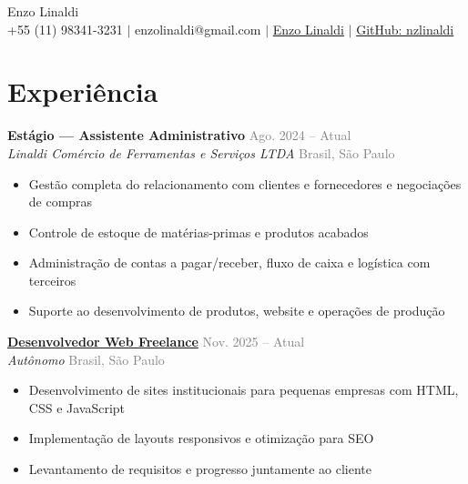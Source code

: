 \documentclass[a4paper, 12pt]{article}
\newcommand{\resumeSubSection}[4]{%
\vspace{-1pt}\noindent
\textbf{#1} \hfill \textcolor{gray}{#2}\\
\textit{#3} \hfill \textcolor{gray}{#4}
}
\newcommand{\resumeItemsSubSection}[1]{%
\vspace{-8pt}\small \begin{itemize}\setlength{\itemsep}{-0.3em}
#1
\end{itemize}
}
\begin{document}
\pagestyle{empty}


\begin{center}
    {\Huge Enzo Linaldi} \\ \vspace{5pt}
    \small \faPhone* +55 (11) 98341-3231 \hspace{1pt} $|$
    \hspace{1pt} \faEnvelope \hspace{2pt} enzolinaldi@gmail.com \hspace{1pt} $|$ 
    \hspace{1pt} \faLinkedin \hspace{2pt} \href{https://www.linkedin.com/in/enzo-linaldi-315204389/}{Enzo Linaldi} \hspace{1pt} $|$
    \hspace{1pt} \faGithub \hspace{2pt} \href{https://github.com/nzlinaldi}{GitHub: nzlinaldi}
    \\ \vspace{-3pt}
\end{center}

\section{Experiência}
\resumeSubSection
{Estágio — Assistente Administrativo}
{Ago. 2024 -- Atual}
{Linaldi Comércio de Ferramentas e Serviços LTDA}{Brasil, São Paulo}

\resumeItemsSubSection{
\item Gestão completa do relacionamento com clientes e fornecedores e negociações de compras
\item Controle de estoque de matérias-primas e produtos acabados
\item Administração de contas a pagar/receber, fluxo de caixa e logística com terceiros
\item Suporte ao desenvolvimento de produtos, website e operações de produção
}

\resumeSubSection {\href{https://vinyacademy.com.br}{Desenvolvedor Web Freelance}}{Nov. 2025 -- Atual}{Autônomo}{Brasil, São Paulo}

\resumeItemsSubSection{
\item Desenvolvimento de sites institucionais para pequenas empresas com HTML, CSS e JavaScript
\item Implementação de layouts responsivos e otimização para SEO
\item Levantamento de requisitos e progresso juntamente ao cliente
}
\end{document}
